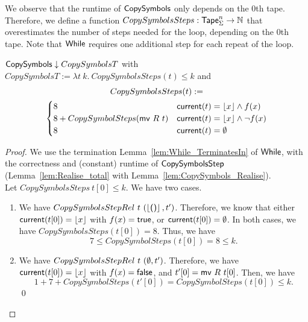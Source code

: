 We observe that the runtime of $\textsf{CopySymbols}$ only depends on the $0$th tape.  Therefore, we define a function
$CopySymbolsSteps : \textsf{Tape}_\Sigma^n \rightarrow \mathbb{N}$ that overestimates the number of steps needed for the loop, depending on the $0$th tape.  Note that
$\textsf{While}$ requires one additional step for each repeat of the loop.
\begin{lemma}
  $\textsf{CopySymbols} \downarrow CopySymbolsT$ with \\
  $CopySymbolsT := \lambda t~k.~CopySymbolsSteps(t) \leq k$ and
  \begin{multline*}
    CopySymbolsSteps (t) := \\
    \begin{cases}
      8                                & \textsf{current}(t)=\left\lfloor {x} \right\rfloor \land f(x) \\
      8 + CopySymbolSteps(\textsf{mv}~R~t) & \textsf{current}(t)=\left\lfloor {x} \right\rfloor \land \lnot f(x) \\
      8                                & \textsf{current}(t)=\emptyset
    \end{cases}
  \end{multline*}
\end{lemma}
\begin{proof}
  We use the termination Lemma~\ref{lem:While_TerminatesIn} of $\textsf{While}$, with the correctness and (constant) runtime of $\textsf{CopySymbolsStep}$
  (Lemma~\ref{lem:Realise_total} with Lemma~\ref{lem:CopySymbols_Realise}).\\
  Let $CopySymbolsSteps~t[0] \leq k$.  We have two cases.
  \begin{enumerate}
  \item We have $CopySymbolsStepRel~t~(\left\lfloor {\ensuremath{\textsf{()}}} \right\rfloor, t')$.  Therefore, we know that either $\textsf{current}(t[0])=\left\lfloor {x} \right\rfloor$ with $f(x)=\textsf{true}$, or
    $\textsf{current}(t[0])=\emptyset$.  In both cases, we have $CopySymbolsSteps(t[0]) = 8$.  Thus, we have
    $$ 7 \leq CopySymbolSteps(t[0]) = 8 \leq k. $$
  \item We have $CopySymbolsStepRel~t~(\emptyset, t')$.  Therefore, we have $\textsf{current}(t[0])=\left\lfloor {x} \right\rfloor$ with $f(x)=\textsf{false}$, and $t'[0]=\textsf{mv}~R~t[0]$.
    Then, we have
    $$ 1+7+CopySymbolSteps(t'[0]) = CopySymbolSteps(t[0]) \leq k.$$
    \qed
  \end{enumerate}
\end{proof}



